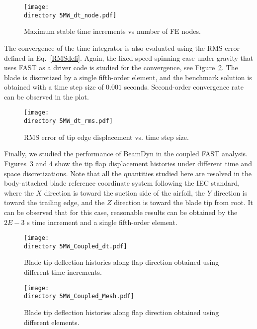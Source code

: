 \documentclass{aiaa-tc}
\def\directory{EPSF/}
\begin{document}
\begin{figure}
    \centering
\texttt{[image: \\directory  5MW\_dt\_node.pdf]}
\caption{Maximum stable time increments vs number of FE nodes.}
\label{fig:5MWdt_node}
\end{figure} 

The convergence of the time integrator is also evaluated using the RMS error defined in Eq.~\eqref{RMSdefi}. Again, the fixed-speed spinning case under gravity that uses FAST as a driver code is studied for the convergence, see Figure~\ref{fig:5MWdt_rms}. The blade is discretized by a single fifth-order element, and the benchmark solution is obtained  with a time step size of $0.001$ seconds. Second-order convergence rate can be observed in the plot.

\begin{figure}
    \centering
\texttt{[image: \\directory  5MW\_dt\_rms.pdf]}
\caption{RMS error of tip edge displacement vs. time step size.}
\label{fig:5MWdt_rms}
\end{figure} 

Finally, we studied the performance of BeamDyn in the coupled FAST analysis. Figures~\ref{fig:5MW_Coupled_dt} and \ref{fig:5MW_Coupled_Mesh} show the tip flap displacement histories under different time and space discretizations. Note that all the quantities studied here are resolved in the body-attached blade reference coordinate system following the IEC standard, where the $X$ direction is toward the suction side of the airfoil, the $Y$ direction is toward the trailing edge, and the $Z$ direction is toward the blade tip from root. It can be observed that for this case, reasonable results can be obtained by the $2E-3$ s time increment and a single fifth-order element.  

\begin{figure}
    \centering
\texttt{[image: \\directory  5MW\_Coupled\_dt.pdf]}
\caption{Blade tip deflection histories along flap direction obtained using different time increments.}
\label{fig:5MW_Coupled_dt}
\end{figure} 

\begin{figure}
    \centering
\texttt{[image: \\directory  5MW\_Coupled\_Mesh.pdf]}
\caption{Blade tip deflection histories along flap direction obtained using different elements.}
\label{fig:5MW_Coupled_Mesh}
\end{figure} 
\end{document}
